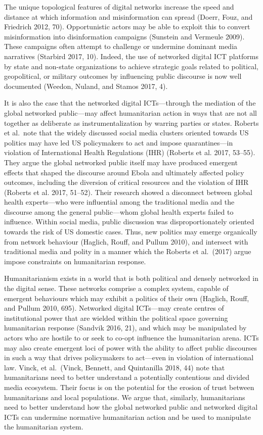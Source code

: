 The unique topological features of digital networks increase the speed
and distance at which information and misinformation can spread (Doerr,
Fouz, and Friedrich 2012, 70). Opportunistic actors may be able to
exploit this to convert misinformation into disinformation campaigns
(Sunstein and Vermeule 2009). These campaigns often attempt to challenge
or undermine dominant media narratives (Starbird 2017, 10). Indeed, the
use of networked digital ICT platforms by state and non-state
organizations to achieve strategic goals related to political,
geopolitical, or military outcomes by influencing public discourse is
now well documented (Weedon, Nuland, and Stamos 2017, 4).

It is also the case that the networked digital ICTs---through the
mediation of the global networked public---may affect humanitarian
action in ways that are not all together as deliberate as
instrumentalization by warring parties or states. Roberts et al.~note
that the widely discussed social media clusters oriented towards US
politics may have led US policymakers to act and impose quarantines---in
violation of International Health Regulations (IHR) (Roberts et al.
2017, 53--55). They argue the global networked public itself may have
produced emergent effects that shaped the discourse around Ebola and
ultimately affected policy outcomes, including the diversion of critical
resources and the violation of IHR (Roberts et al. 2017, 51--52). Their
research showed a disconnect between global health experts---who were
influential among the traditional media and the discourse among the
general public---whom global health experts failed to influence. Within
social media, public discussion was disproportionately oriented towards
the risk of US domestic cases. Thus, new politics may emerge organically
from network behaviour (Haglich, Rouff, and Pullum 2010), and intersect
with traditional media and polity in a manner which the Roberts et
al.~(2017) argue impose constraints on humanitarian response.

Humanitarianism exists in a world that is both political and densely
networked in the digital sense. These networks comprise a complex
system, capable of emergent behaviours which may exhibit a politics of
their own (Haglich, Rouff, and Pullum 2010, 695). Networked digital
ICTs---may create centres of institutional power that are wielded within
the political space governing humanitarian response (Sandvik 2016, 21),
and which may be manipulated by actors who are hostile to or seek to
co-opt influence the humanitarian arena. ICTs may also create emergent
loci of power with the ability to affect public discourses in such a way
that drives policymakers to act---even in violation of international
law. Vinck, et al.~(Vinck, Bennett, and Quintanilla 2018, 44) note that
humanitarians need to better understand a potentially contentious and
divided media ecosystem. Their focus is on the potential for the erosion
of trust between humanitarians and local populations. We argue that,
similarly, humanitarians need to better understand how the global
networked public and networked digital ICTs can undermine normative
humanitarian action and be used to manipulate the humanitarian system.

